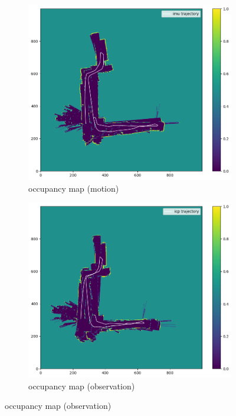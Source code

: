 \documentclass[conference]{IEEEtran}
\begin{document}
\begin{figure}[htbp]
    \begin{subfigure}{0.24\textwidth}
        \includegraphics[width=\linewidth]{../img/omap_21_imu.png}
        \caption{occupancy map (motion)}
        \label{fig:omap_21_imu}
    \end{subfigure}
    \hfill
    \begin{subfigure}{0.24\textwidth}
        \includegraphics[width=\linewidth]{../img/omap_21_icp.png}
        \caption{occupancy map (observation)}

\end{subfigure}
\end{figure}
\end{document}
